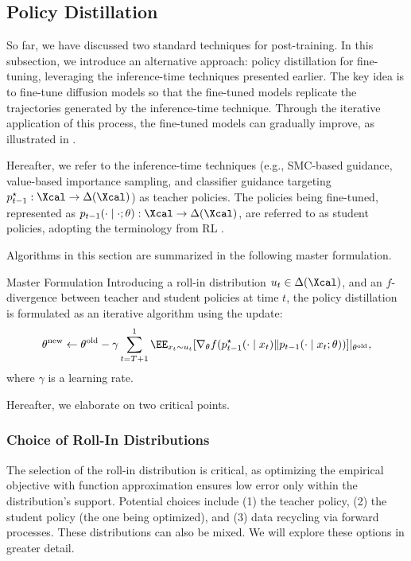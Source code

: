 \subsection{Policy Distillation}\label{sec:policy_distil}


So far, we have discussed two standard techniques for post-training. In this subsection, we introduce an alternative approach: policy distillation for fine-tuning, leveraging the inference-time techniques presented earlier. The key idea is to fine-tune diffusion models so that the fine-tuned models replicate the trajectories generated by the inference-time technique. Through the iterative application of this process, the fine-tuned models can gradually improve, as illustrated in .

{ Hereafter, we refer to the inference-time techniques (e.g., SMC-based guidance, value-based importance sampling, and classifier guidance targeting $p^{\star}_{t-1}:\Xcal \to \Delta(\Xcal)$) as teacher policies. The policies being fine-tuned, represented as $p_{t-1}(\cdot \mid \cdot; \theta):\Xcal \to \Delta(\Xcal)$, are referred to as student policies, adopting the terminology from RL \citep{czarnecki2019distilling}.  } 

Algorithms in this section are summarized in the following master formulation. 


\begin{AIbox}{Master Formulation}
Introducing a roll-in distribution $u_t \in \Delta(\Xcal)$, and an $f$-divergence between teacher and student policies at time $t$, the policy distillation is formulated as an iterative algorithm using the update: 
\begin{align*}
    \theta^{\mathrm{new}} \leftarrow \theta^{\mathrm{old}}  - \gamma \sum_{t=T+1}^1 \EE_{x_t \sim u_t}[ \nabla_{\theta} 
 f(p^{\star}_{t-1}(\cdot \mid x_t) \|p_{t-1}(\cdot \mid x_t;\theta) )]|_{\theta^{\mathrm{old}}}, 
\end{align*}
where $\gamma$ is a learning rate. 
\end{AIbox}
Hereafter, we elaborate on two critical points. 






\subsubsection{Choice of Roll-In Distributions} 

The selection of the roll-in distribution is critical, as optimizing the empirical objective with function approximation ensures low error only within the distribution's support. Potential choices include (1) the teacher policy, (2) the student policy (the one being optimized), and (3) data recycling via forward processes. These distributions can also be mixed. We will explore these options in greater detail.

